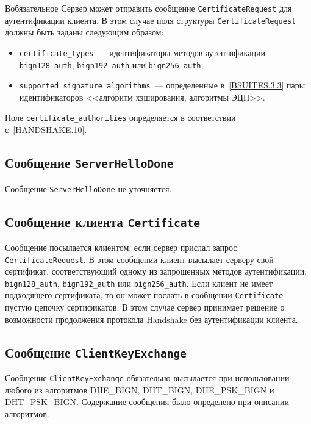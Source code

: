 \begin{appendix}{В}{обязательное}
Сервер может отправить сообщение \lstinline{CertificateRequest} для аутентификации 
клиента. В этом случае поля структуры \lstinline{CertificateRequest} должны быть 
заданы следующим образом:  

\begin{itemize}
\item[--]
\lstinline{certificate_types}~--- идентификаторы методов аутентификации 
\lstinline{bign128_auth}, \lstinline{bign192_auth} или 
\lstinline{bign256_auth}; 

\item[--]
\lstinline{supported_signature_algorithms}~--- определенные 
в~\ref{BSUITES.3.3} пары идентификаторов <<алгоритм хэширования, алгоритмы
ЭЦП>>.
\end{itemize}

Поле \lstinline{certificate_authorities} определяется в соответствии 
с~\ref{HANDSHAKE.10}. 

\subsection{Сообщение \lstinline{ServerHelloDone}}\label{BSUITES.4.6}

Сообщение \lstinline{ServerHelloDone} не уточняется. 

\subsection{Сообщение клиента \lstinline{Certificate}}\label{BSUITES.4.7}

Сообщение посылается клиентом, если сервер прислал запрос 
\lstinline{CertificateRequest}. В этом сообщении клиент высылает серверу свой 
сертификат, соответствующий одному из запрошенных методов аутентификации: 
\lstinline{bign128_auth}, \lstinline{bign192_auth} или 
\mbox{\lstinline{bign256_auth}.} Если клиент не имеет подходящего 
сертификата, то он может послать в сообщении \lstinline{Certificate} 
пустую цепочку сертификатов. В этом случае сервер принимает решение о  
возможности продолжения протокола Handshake без аутентификации клиента. 

\subsection{Сообщение \lstinline{ClientKeyExchange}}\label{BSUITES.4.8}

Сообщение \lstinline{ClientKeyExchange} обязательно высылается при 
использовании любого из алгоритмов DHE\_BIGN, DHT\_BIGN, DHE\_PSK\_BIGN и 
DHT\_PSK\_BIGN. Содержание сообщения было определено при описании 
алгоритмов.  


\end{appendix}
